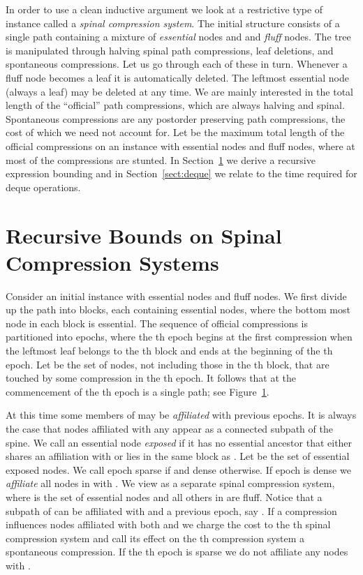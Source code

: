 \documentclass{article}
\begin{document}
In order to use a clean inductive argument we look at a restrictive type of instance called
a {\em spinal compression system}.
The initial structure consists of a single path containing a mixture of {\em essential} nodes and
and {\em fluff} nodes.  The tree is manipulated through halving spinal path compressions, 
leaf deletions, and spontaneous compressions.   Let us
go through each of these in turn.  Whenever a fluff node becomes a leaf it is automatically deleted. 
The leftmost essential node (always a leaf) may be deleted at any time.
We are mainly interested in the total length of the ``official'' path compressions,
which are always halving and spinal.  Spontaneous compressions are any postorder preserving path compressions,
the cost of which we need not account for.
Let  be the maximum total length of the official compressions on an instance with 
 essential nodes and  fluff nodes, where at most  of the compressions are stunted.
In Section~\ref{sect:pc} we derive a recursive expression bounding  and in Section~\ref{sect:deque}
we relate  to the time required for deque operations.

\section{Recursive Bounds on Spinal Compression Systems}\label{sect:pc}

Consider an initial instance with  essential nodes and  fluff nodes.  We first divide up the path
into  blocks, each containing  essential nodes, where the bottom most node in each block
is essential.  The sequence of official compressions is partitioned into  epochs, where the th epoch
begins at the first compression when the leftmost leaf belongs to the th block and ends 
at the beginning of the th epoch.  Let  be the set of nodes, not including those in the th block, that are touched by some compression
in the th epoch.  It follows that at the commencement of the th epoch  is a single path; see Figure~\ref{fig:Ij}.
\begin{figure}[h!]
\begin{center}
\end{center}
\caption{\label{fig:Ij}}
\end{figure}
At this time some members of  may be {\em affiliated}
with previous epochs.  It is always the case that nodes affiliated with any  appear as a connected subpath of the spine.
We call an essential node  {\em exposed} if it has no essential ancestor that either shares an affiliation with  or lies
in the same block as .
Let  be the set of essential exposed nodes.  
We call epoch  sparse 
if  and dense otherwise.  
If epoch  is dense we {\em affiliate} all nodes in  with .
We view  as a separate spinal compression system, where  is the set of essential nodes and all others in  
are fluff.  Notice that a subpath of  can be affiliated with  and a previous epoch, say .  If a compression
influences nodes affiliated with both  and  we charge the cost to the th spinal compression system and call its effect
on the th compression system a spontaneous compression.
If the th epoch is sparse we do not affiliate any nodes with .
\end{document}
